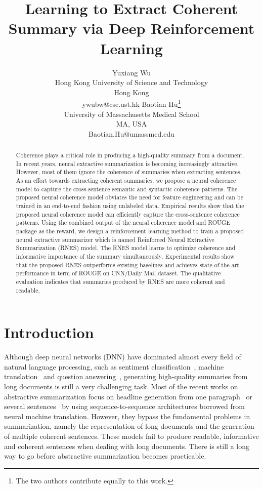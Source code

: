 \documentclass[letterpaper]{article} \usepackage{aaai18}  \usepackage{times}  \usepackage{helvet}  \usepackage{courier}  \usepackage{url}  \usepackage{graphicx}  \usepackage{amssymb}
\begin{document}
\title{Learning to Extract Coherent Summary via Deep Reinforcement Learning}
	\author{Yuxiang Wu \\ Hong Kong University of Science and Technology\\Hong Kong\\ywubw@cse.ust.hk
	\And Baotian Hu\thanks{The two authors contribute equally to this work.}\\University of Massachusetts Medical School\\MA, USA\\Baotian.Hu@umassmed.edu}

	\maketitle
	\begin{abstract}
		 Coherence plays a critical role in producing a high-quality summary from a document. In recent years, neural extractive summarization is becoming increasingly attractive. However, most of them ignore the coherence of summaries when extracting sentences. As an effort towards extracting coherent summaries, we propose a neural coherence model to capture the cross-sentence semantic and syntactic coherence patterns. The proposed neural coherence model obviates the need for feature engineering and can be trained in an end-to-end fashion using unlabeled data. Empirical results show that the proposed neural coherence model can efficiently capture the cross-sentence coherence patterns. Using the combined output of the neural coherence model and ROUGE package as the reward, we design a reinforcement learning method to train a proposed neural extractive summarizer which is named Reinforced Neural Extractive Summarization (RNES) model. The RNES model learns to optimize coherence and informative importance of the summary simultaneously. Experimental results show that the proposed RNES outperforms existing baselines and achieves state-of-the-art performance in term of ROUGE on CNN/Daily Mail dataset. The qualitative evaluation indicates that summaries produced by RNES are more coherent and readable.
	\end{abstract}
	
	
	\section{Introduction}
	Although deep neural networks (DNN) have dominated almost every field of natural language processing, such as sentiment classification~\cite{duyutang-sentiment}, machine translation~\cite{cho-translation} and question answering~\cite{xiaoqiang}, generating high-quality summaries from long documents is still a very challenging task. Most of the recent works on abstractive summarization focus on headline generation from one paragraph~\cite{fb2015} or several sentences~\cite{lcsts} by using sequence-to-sequence architectures borrowed from neural machine translation. However, they bypass the fundamental problems in summarization, namely the representation of long documents and the generation of multiple coherent sentences. These models fail to produce readable, informative and coherent sentences when dealing with long documents. There is still a long way to go before abstractive summarization becomes practicable.
	
\end{document}
